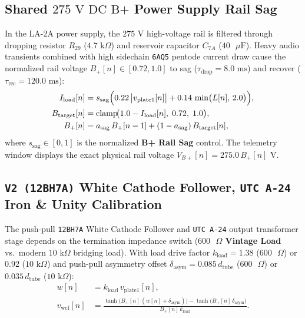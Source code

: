 \documentclass[11pt,a4paper]{article}
\begin{document}
\subsection{Shared \texorpdfstring{$275\text{ V DC B+}$}{275V DC B+} Power Supply Rail Sag}

In the LA-2A power supply, the $275\text{ V}$ high-voltage rail is filtered through dropping resistor $R_{29}$ ($4.7\text{ k}\Omega$) and reservoir capacitor $C_{7A}$ ($40\text{ }\mu\text{F}$). Heavy audio transients combined with high sidechain \texttt{6AQ5} pentode current draw cause the normalized rail voltage $B_+[n] \in [0.72, 1.0]$ to sag ($\tau_{\text{drop}} = 8.0\text{ ms}$) and recover ($\tau_{\text{rec}} = 120.0\text{ ms}$):
\begin{align}
    I_{\text{load}}[n] &= s_{\text{sag}}\Bigl(0.22\,\bigl|v_{\text{plate1}}[n]\bigr| + 0.14\,\min\bigl(L[n],\,2.0\bigr)\Bigr), \\
    B_{\text{target}}[n] &= \operatorname{clamp}\!\bigl(1.0 - I_{\text{load}}[n],\; 0.72,\; 1.0\bigr), \\
    B_+[n] &= a_{\text{sag}}\,B_+[n-1] + (1 - a_{\text{sag}})\,B_{\text{target}}[n],
\end{align}
where $s_{\text{sag}} \in [0, 1]$ is the normalized \textbf{B+ Rail Sag} control. The telemetry window displays the exact physical rail voltage $V_{B+}[n] = 275.0\,B_+[n]\text{ V}$.

\subsection{\texttt{V2 (12BH7A)} White Cathode Follower, \texttt{UTC A-24} Iron \& Unity Calibration}

The push-pull \texttt{12BH7A} White Cathode Follower and \texttt{UTC A-24} output transformer stage depends on the termination impedance switch (\textbf{$600\text{ }\Omega$ Vintage Load} vs.\ modern $10\text{ k}\Omega$ bridging load). With load drive factor $k_{\text{load}} = 1.38$ ($600\text{ }\Omega$) or $0.92$ ($10\text{ k}\Omega$) and push-pull asymmetry offset $\delta_{\text{asym}} = 0.085\,d_{\text{tube}}$ ($600\text{ }\Omega$) or $0.035\,d_{\text{tube}}$ ($10\text{ k}\Omega$):
\begin{align}
    w[n] &= k_{\text{load}}\,v_{\text{plate1}}[n], \\
    v_{\text{wcf}}[n] &= \frac{\tanh\!\bigl(B_+[n]\,(w[n] + \delta_{\text{asym}})\bigr) - \tanh\!\bigl(B_+[n]\,\delta_{\text{asym}}\bigr)}{B_+[n]\,k_{\text{load}}}.
\end{align}
\end{document}
